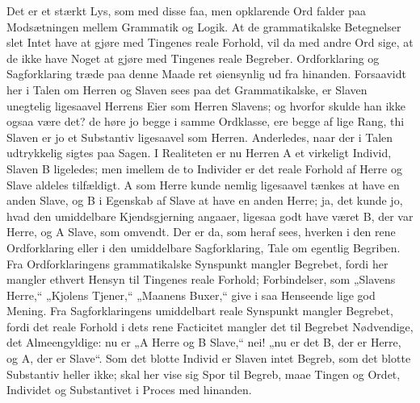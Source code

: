 \documentclass[12pt]{book}
\newcommand{\opage}[1]{\marginnote{\footnotesize\textit{[#1]}}}
\begin{document}
Det er et stærkt Lys, som med disse faa, men opklarende
\opage{6}Ord falder paa Modsætningen mellem Grammatik og Logik. At de grammatikalske Betegnelser slet Intet have at gjøre med Tingenes reale Forhold, vil da med andre Ord sige, at de ikke have Noget at gjøre med Tingenes reale Begreber. Ordforklaring og Sagforklaring træde paa denne Maade ret øiensynlig ud fra hinanden. Forsaavidt her i Talen om Herren og Slaven sees paa det Grammatikalske, er Slaven unegtelig ligesaavel Herrens Eier som Herren Slavens; og hvorfor skulde han ikke ogsaa være det? de høre jo begge i samme Ordklasse, ere begge af lige Rang, thi Slaven er jo et Substantiv ligesaavel som Herren. Anderledes, naar der i Talen udtrykkelig sigtes paa Sagen. I Realiteten er nu Herren A et virkeligt Individ, Slaven B ligeledes; men imellem de to Individer er det reale Forhold af Herre og Slave aldeles tilfældigt. A som Herre kunde nemlig ligesaavel tænkes at have en anden Slave, og B i Egenskab af Slave at have en anden Herre; ja, det kunde jo, hvad den umiddelbare Kjendsgjerning angaaer, ligesaa godt have været B, der var Herre, og A Slave, som omvendt. Der er da, som heraf sees, hverken i den rene Ordforklaring eller i den umiddelbare Sagforklaring, Tale om egentlig Begriben. Fra Ordforklaringens grammatikalske Synspunkt mangler Begrebet, fordi her mangler ethvert Hensyn til Tingenes reale Forhold; Forbindelser, som „Slavens Herre,“ „Kjolens Tjener,“ „Maanens Buxer,“ give i saa Henseende lige god Mening. Fra Sagforklaringens umiddelbart reale Synspunkt mangler Begrebet, fordi det reale Forhold i dets rene Facticitet mangler det til Begrebet Nødvendige, det Almeengyldige: nu er „A Herre og B Slave,“ nei! „nu er det B, der er Herre, og A, der er Slave“. Som det blotte Individ er Slaven intet Begreb, som det blotte Substantiv heller ikke; skal her vise sig Spor til Begreb, maae Tingen og Ordet, Individet og Substantivet i Proces med hinanden.
\end{document}
